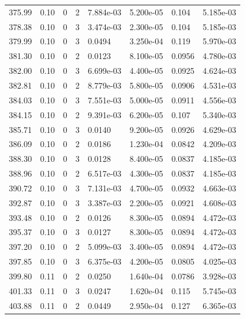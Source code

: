 \documentclass[preview]{standalone}
\begin{document}
{{{{{{{\begin{tabular}{L{1.2cm}C{1.2cm} C{0.3cm}C{0.5cm} C{1.4cm}C{1.4cm} C{1.4cm}C{1.4cm}}
  375.99  &  0.10  & 0     &  2 &  7.884e-03  & 5.200e-05  & 0.104 &  5.185e-03   \\ 
  378.38  &  0.10  & 0     &  3 &  3.474e-03  & 2.300e-05  & 0.104 &  5.185e-03   \\ 
  379.99  &  0.10  & 0     &  3 &  0.0494  & 3.250e-04  & 0.119 &  5.970e-03   \\ 
  381.30  &  0.10  & 0     &  2 &  0.0123  & 8.100e-05  & 0.0956 &  4.780e-03   \\ 
  382.00  &  0.10  & 0     &  3 &  6.699e-03  & 4.400e-05  & 0.0925 &  4.624e-03   \\ 
  382.81  &  0.10  & 0     &  2 &  8.779e-03  & 5.800e-05  & 0.0906 &  4.531e-03   \\ 
  384.03  &  0.10  & 0     &  3 &  7.551e-03  & 5.000e-05  & 0.0911 &  4.556e-03   \\ 
  384.15  &  0.10  & 0     &  2 &  9.391e-03  & 6.200e-05  & 0.107 &  5.340e-03   \\ 
  385.71  &  0.10  & 0     &  3 &  0.0140  & 9.200e-05  & 0.0926 &  4.629e-03   \\ 
  386.09  &  0.10  & 0     &  2 &  0.0186  & 1.230e-04  & 0.0842 &  4.209e-03   \\ 
  388.30  &  0.10  & 0     &  3 &  0.0128  & 8.400e-05  & 0.0837 &  4.185e-03   \\ 
  388.96  &  0.10  & 0     &  2 &  6.517e-03  & 4.300e-05  & 0.0837 &  4.185e-03   \\ 
  390.72  &  0.10  & 0     &  3 &  7.131e-03  & 4.700e-05  & 0.0932 &  4.663e-03   \\ 
  392.87  &  0.10  & 0     &  3 &  3.387e-03  & 2.200e-05  & 0.0921 &  4.608e-03   \\ 
  393.48  &  0.10  & 0     &  2 &  0.0126  & 8.300e-05  & 0.0894 &  4.472e-03   \\ 
  395.37  &  0.10  & 0     &  3 &  0.0127  & 8.300e-05  & 0.0894 &  4.472e-03   \\ 
  397.20  &  0.10  & 0     &  2 &  5.099e-03  & 3.400e-05  & 0.0894 &  4.472e-03   \\ 
  397.85  &  0.10  & 0     &  3 &  6.375e-03  & 4.200e-05  & 0.0805 &  4.025e-03   \\ 
  399.80  &  0.11  & 0     &  2 &  0.0250  & 1.640e-04  & 0.0786 &  3.928e-03   \\ 
  401.33  &  0.11  & 0     &  3 &  0.0247  & 1.620e-04  & 0.115 &  5.745e-03   \\ 
  403.88  &  0.11  & 0     &  2 &  0.0449  & 2.950e-04  & 0.127 &  6.365e-03   \\ 

\end{tabular}}}}}}}}
\end{document}
